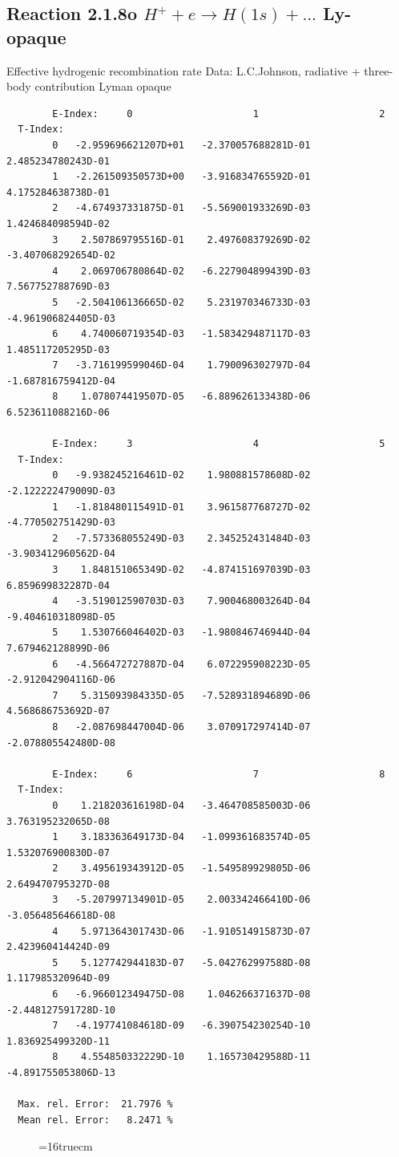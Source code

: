 \documentclass[12pt,dvips]{article}
\begin{document}
\subsection{
  Reaction 2.1.8o $ H^+ + e \rightarrow H(1s) + ...$ Ly-opaque
}

   Effective hydrogenic recombination rate
   Data: L.C.Johnson, radiative + three-body contribution
   Lyman opaque


\begin{small}\begin{verbatim}
        E-Index:     0                     1                     2
  T-Index:
        0   -2.959696621207D+01   -2.370057688281D-01    2.485234780243D-01
        1   -2.261509350573D+00   -3.916834765592D-01    4.175284638738D-01
        2   -4.674937331875D-01   -5.569001933269D-03    1.424684098594D-02
        3    2.507869795516D-01    2.497608379269D-02   -3.407068292654D-02
        4    2.069706780864D-02   -6.227904899439D-03    7.567752788769D-03
        5   -2.504106136665D-02    5.231970346733D-03   -4.961906824405D-03
        6    4.740060719354D-03   -1.583429487117D-03    1.485117205295D-03
        7   -3.716199599046D-04    1.790096302797D-04   -1.687816759412D-04
        8    1.078074419507D-05   -6.889626133438D-06    6.523611088216D-06

        E-Index:     3                     4                     5
  T-Index:
        0   -9.938245216461D-02    1.980881578608D-02   -2.122222479009D-03
        1   -1.818480115491D-01    3.961587768727D-02   -4.770502751429D-03
        2   -7.573368055249D-03    2.345252431484D-03   -3.903412960562D-04
        3    1.848151065349D-02   -4.874151697039D-03    6.859699832287D-04
        4   -3.519012590703D-03    7.900468003264D-04   -9.404610318098D-05
        5    1.530766046402D-03   -1.980846746944D-04    7.679462128899D-06
        6   -4.566472727887D-04    6.072295908223D-05   -2.912042904116D-06
        7    5.315093984335D-05   -7.528931894689D-06    4.568686753692D-07
        8   -2.087698447004D-06    3.070917297414D-07   -2.078805542480D-08

        E-Index:     6                     7                     8
  T-Index:
        0    1.218203616198D-04   -3.464708585003D-06    3.763195232065D-08
        1    3.183363649173D-04   -1.099361683574D-05    1.532076900830D-07
        2    3.495619343912D-05   -1.549589929805D-06    2.649470795327D-08
        3   -5.207997134901D-05    2.003342466410D-06   -3.056485646618D-08
        4    5.971364301743D-06   -1.910514915873D-07    2.423960414424D-09
        5    5.127742944183D-07   -5.042762997588D-08    1.117985320964D-09
        6   -6.966012349475D-08    1.046266371637D-08   -2.448127591728D-10
        7   -4.197741084618D-09   -6.390754230254D-10    1.836925499320D-11
        8    4.554850332229D-10    1.165730429588D-11   -4.891755053806D-13

  Max. rel. Error:  21.7976 %
  Mean rel. Error:   8.2471 %

\end{verbatim}\end{small}
\begin{figure} \label{2.1.8o}
\epsfxsize=16truecm
\end{figure}
\newpage
\end{document}

